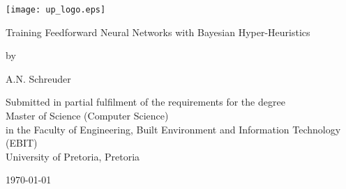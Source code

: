 \pagestyle{empty}
\begin{titlepage}
    \begin{center}
        \texttt{[image: up\_logo.eps]}
        \vspace{2cm}

        \Huge
        \textsf{Training Feedforward Neural Networks with Bayesian
        Hyper-Heuristics}
        \vspace{1cm}

        \large
        \textsf{by}
        \vspace{1cm}

        \large
        \textsf{A.N. Schreuder}
        \vfill

        \normalsize
        \textsf{
            Submitted in partial fulfilment of the requirements for the degree\\
            Master of Science (Computer Science)\\
            in the Faculty of Engineering, Built Environment and Information
            Technology (EBIT)\\
            University of Pretoria, Pretoria
        }
        \vspace{2cm}

        \normalsize
        \textsf{\monthyeardate\today}
    \end{center}
\end{titlepage}
\newpage

